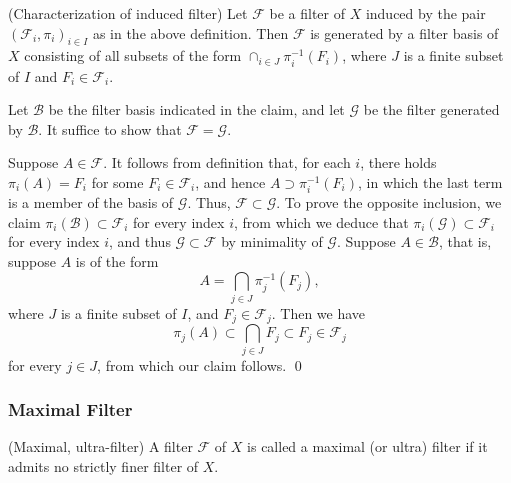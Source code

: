 \documentclass{article}
\begin{document}
\begin{prp}\label{characterize induced filter} (Characterization of induced filter)
    Let \( \mathscr{F} \) be a filter of \( X \) induced by the pair \( (\mathscr{F}_i ,\pi_i)_{i \in I} \) as in the above definition. Then \( \mathscr{F} \) is generated by a filter basis of \( X \) consisting of all subsets of the form \( \cap_{i \in J} \pi_i ^{-1}(F_i)\), where \( J \) is a finite subset of \( I \) and \( F_i \in \mathscr{F}_i \).
\end{prp}
\begin{prf}
    Let \( \mathscr{B} \) be the filter basis indicated in the claim, and let \( \mathscr{G} \) be the filter generated by \( \mathscr{B} \). It suffice to show that \( \mathscr{F}=\mathscr{G} \).

    Suppose \( A \in \mathscr{F}\). It follows from definition that, for each \( i \), there holds \( \pi_i(A) = F_i \) for some \( F_i \in \mathscr{F}_i \), and hence \( A \supset \pi_i ^{-1}(F_i) \), in which the last term is a member of the basis of \( \mathscr{G} \). Thus, \( \mathscr{F} \subset \mathscr{G} \). To prove the opposite inclusion, we claim \( \pi_i(\mathscr{B})\subset \mathscr{F}_i \) for every index \( i \), from which we deduce that \( \pi_i(\mathscr{G})\subset \mathscr{F}_i \) for every index \( i \), and thus \( \mathscr{G} \subset \mathscr{F} \) by minimality of \( \mathscr{G} \). Suppose \( A \in \mathscr{B}\), that is, suppose \( A \) is of the form
    \[
        A = \bigcap_{j \in J} \pi_j^{-1}(F_j),
    \]
    where \( J \) is a finite subset of \( I \), and \( F_j \in \mathscr{F}_j \). Then we have
    \[
        \pi_j(A) \subset \bigcap_{j \in J}F_j \subset F_j \in \mathscr{F}_j
    \]
    for every \( j \in J \), from which our claim follows.
    \qed\end{prf}

\subsubsection{Maximal Filter} \label{maximal filter}

\begin{dfn} (Maximal, ultra-filter)
    A filter \( \mathscr{F} \) of \( X \) is called a maximal (or ultra) filter if it admits no strictly finer filter of \( X \).
\end{dfn}
\end{document}
